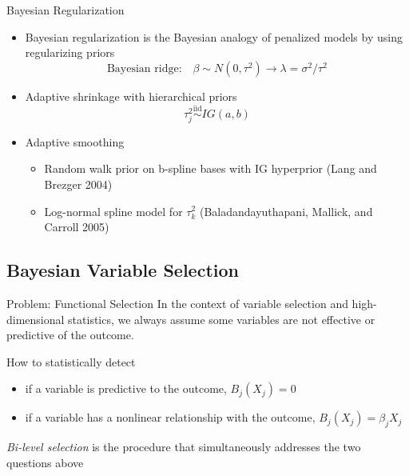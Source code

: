 \documentclass[
  ignorenonframetext,
  aspectratio=169]{beamer}
\providecommand{\tightlist}{%
  \setlength{\itemsep}{0pt}\setlength{\parskip}{0pt}}
\newcommand{\simiid}{\overset{\text{iid}}{\sim}}
\begin{document}
\begin{frame}{Bayesian Regularization}
\protect\hypertarget{bayesian-regularization-1}{}
\begin{itemize}
\tightlist
\item
  Bayesian regularization is the Bayesian analogy of penalized models by
  using regularizing priors \[
   \text{Bayesian ridge:} \quad \beta \sim N(0, \tau^2) \rightarrow  \lambda = \sigma^2/\tau^2
  \]
\item
  Adaptive shrinkage with hierarchical priors \[
   \tau^2_j \simiid IG(a, b)
  \]
\item
  Adaptive smoothing

  \begin{itemize}
  \tightlist
  \item
    Random walk prior on b-spline bases with IG hyperprior (Lang and
    Brezger 2004)
  \item
    Log-normal spline model for \(\tau^2_k\) (Baladandayuthapani,
    Mallick, and Carroll 2005)
  \end{itemize}
\end{itemize}
\end{frame}

\hypertarget{bayesian-variable-selection}{%
\subsection{Bayesian Variable
Selection}\label{bayesian-variable-selection}}

\begin{frame}{Problem: Functional Selection}
\protect\hypertarget{problem-functional-selection}{}
In the context of variable selection and high-dimensional statistics, we
always assume some variables are not effective or predictive of the
outcome.

\begin{tcolorbox}[colback=green!5,colframe=green!40!black,title=Question]
How to statistically detect
  \begin{itemize}
    \item if a variable is predictive to the outcome, $B_j(X_j) = 0$
    \item if a variable has a nonlinear relationship with the outcome, $B_j(X_j) = \beta_j X_j$
  \end{itemize}
\end{tcolorbox}

\emph{Bi-level selection} is the procedure that simultaneously addresses
the two questions above
\end{frame}
\end{document}
